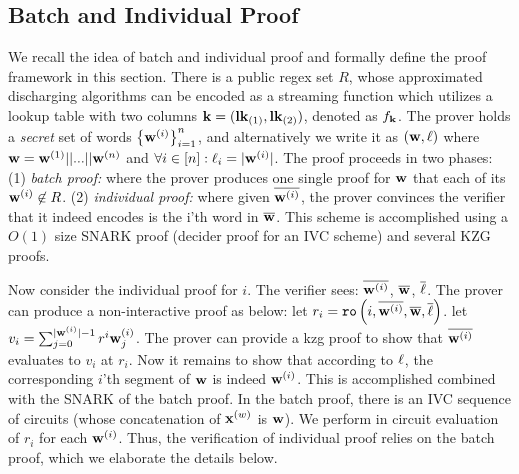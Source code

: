\subsection{Batch and Individual Proof}
We recall the idea of batch and individual proof and formally define the
proof framework in this section. There is a public regex set
$R$, whose approximated discharging algorithms can be encoded
as a streaming function which utilizes
a lookup table with two columns ${{\mathbf {k}}} = ({{\mathbf {lk}}}_{(1)}, {{\mathbf {lk}}}_{(2)})$, 
denoted as $f_{{\mathbf {k}}}$. The prover holds
a {\em secret} set of words 
$\left\{{{\mathbf {w}}}^{(i)} \right\}_{i=1}^n$, and alternatively
we write it as $({{\mathbf {w}}}, {{\mathbf {\ell}}})$ where 
${{\mathbf {w}}} = {{\mathbf {w}}}^{(1)} || ... || {{\mathbf {w}}}^{(n)}$ and
$\forall i\in[n]: {{\mathbf {\ell}}}_i = |{{\mathbf {w}}}^{(i)}|$. 
The proof proceeds in two phases: (1) {\em batch proof:} where
the prover produces one single proof for ${{\mathbf {w}}}$ that each of its
${{\mathbf {w}}}^{(i)} \not\in R$. (2) {\em individual proof:}
where given $\overline{{{\mathbf {w}}}^{(i)}}$, the prover convinces the verifier that
it indeed encodes is the i'th word in $\overline{{{\mathbf {w}}}}$.
This scheme is accomplished using a $O(1)$ size SNARK proof (decider
proof for an IVC scheme) and several KZG proofs.

Now consider the individual proof for $i$. The verifier sees:
$\overline{{{\mathbf {w}}}^{(i)}}$, $\overline{{{\mathbf {w}}}}$, $\overline{{{\mathbf {\ell}}}}$.
The prover can produce a non-interactive proof as below:
let $r_i = \texttt{ro}\left(i, \overline{{{\mathbf {w}}}^{(i)}}, \overline{{{\mathbf {w}}}}, 
\overline{{{\mathbf {\ell}}}}\right)$.
let $v_i = \sum_{j=0}^{|{{\mathbf {w}}}^{(i)}|-1} r^i {{\mathbf {w}}}^{(i)}_{j}$.
The prover can provide a kzg proof to show that
$\overline{{{\mathbf {w}}}^{(i)}}$ evaluates to $v_i$ at $r_i$.
Now it remains to show that according to 
${{\mathbf {\ell}}}$, the corresponding $i$'th segment
of ${{\mathbf {w}}}$ is indeed ${{\mathbf {w}}}^{(i)}$.
This is accomplished combined with the SNARK of the 
batch proof. In the batch proof, there is an IVC sequence
of circuits (whose concatenation of ${{\mathbf {x}}}^{(w)}$ is ${{\mathbf {w}}}$).
We perform in circuit evaluation of $r_i$ for each ${{\mathbf {w}}}^{(i)}$.
Thus, the verification of individual proof relies on the batch proof,
which we elaborate the details below.

